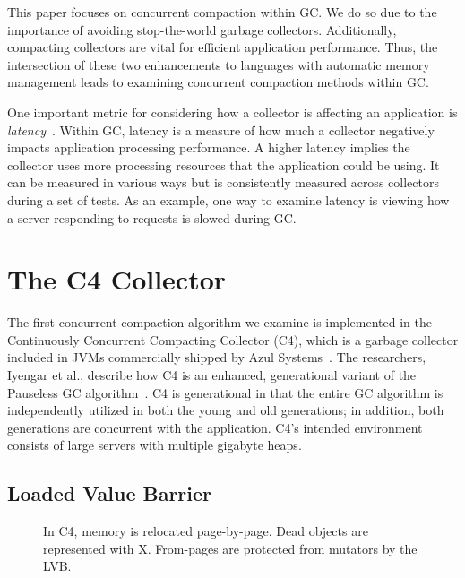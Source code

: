 \documentclass{sig-alternate}
\begin{document}
This paper focuses on
concurrent compaction within GC. We do so due to the importance 
of avoiding stop-the-world garbage collectors. Additionally, compacting
collectors are vital for efficient application performance. Thus,
the intersection of these two enhancements to languages with automatic memory management leads
to examining concurrent compaction methods within GC.

One important metric for considering
how a collector is affecting an application is \emph{latency}~\cite{Lindblom:2011}.
Within GC, latency is a measure of how much a collector negatively impacts
application processing performance. A higher latency implies the collector
uses more processing resources that the application could be using. It 
can be measured in various ways but is consistently measured across 
collectors during a set of tests. As an example, one way to
examine latency is viewing how a server responding to requests is slowed
during GC.


\section{The C4 Collector}
\label{sec:c4}

The first concurrent compaction algorithm we examine is implemented in the 
Continuously Concurrent Compacting Collector (C4), which is a garbage collector 
included in JVMs commercially shipped by Azul Systems~\cite{Tene:C4}. The 
researchers, Iyengar et al., describe how C4 is an enhanced, generational variant
of the Pauseless GC algorithm~\cite{Click:Pauseless}. C4 is generational in 
that the entire GC algorithm is independently utilized in both the young and old generations;
in addition, both generations are concurrent with the application. 
C4's intended environment consists of large servers with multiple gigabyte heaps.


\subsection{Loaded Value Barrier}
\label{sec:c4LVB}

\begin{figure}
\centering
{}
\caption{In C4, memory is relocated
page-by-page. Dead objects are represented with X.
From-pages are protected from mutators by the LVB.}
\label{fig:c4Memory}
\end{figure}

\end{document}
